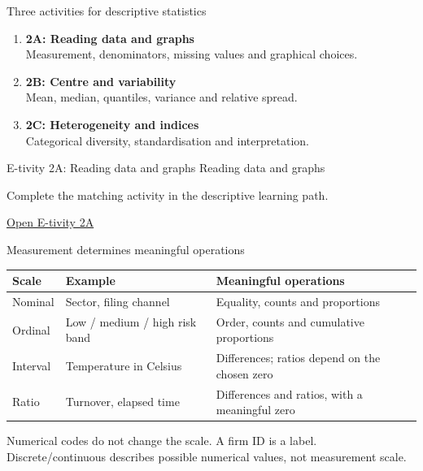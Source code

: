 \begin{frame}{Three activities for descriptive statistics}
\begin{enumerate}
\item \textbf{2A: Reading data and graphs}\\Measurement, denominators, missing values and graphical choices.
\item \textbf{2B: Centre and variability}\\Mean, median, quantiles, variance and relative spread.
\item \textbf{2C: Heterogeneity and indices}\\Categorical diversity, standardisation and interpretation.
\end{enumerate}
\end{frame}


\begin{frame}{E-tivity 2A: Reading data and graphs}
\Large Reading data and graphs\par\vspace{5mm}
\normalsize Complete the matching activity in the descriptive learning path.\par
\href{https://silviasaliniunimi.github.io/data-analysis-tax-compliance/02a-graphs.html}{Open E-tivity 2A}\par

\end{frame}

\begin{frame}{Measurement determines meaningful operations}
\small\begin{tabular}{>{\raggedright\arraybackslash}p{}>{\raggedright\arraybackslash}p{}>{\raggedright\arraybackslash}p{}}\toprule
\textbf{Scale} & \textbf{Example} & \textbf{Meaningful operations}\\\midrule
Nominal & Sector, filing channel & Equality, counts and proportions\\[3mm]
Ordinal & Low / medium / high risk band & Order, counts and cumulative proportions\\[3mm]
Interval & Temperature in Celsius & Differences; ratios depend on the chosen zero\\[3mm]
Ratio & Turnover, elapsed time & Differences and ratios, with a meaningful zero\\\bottomrule
\end{tabular}\par
\par\vspace{3mm}\normalsize Numerical codes do not change the scale. A firm ID is a label.\\
Discrete/continuous describes possible numerical values, not measurement scale.
\end{frame}

